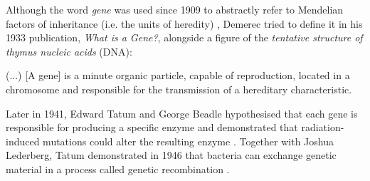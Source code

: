 Although the word \emph{gene} was used since 1909 to abstractly refer to Mendelian factors of inheritance (i.e. the units of heredity) \cite{}, Demerec tried to define it in his 1933 publication, \emph{What is a Gene?}, alongside a figure of the \emph{tentative structure of thymus nucleic acids} (DNA):

\begin{displayquote}
(...) [A gene] is a minute organic particle, capable of reproduction, located in a chromosome and responsible for the transmission of a hereditary characteristic.
\end{displayquote}

Later in 1941, Edward Tatum and George Beadle hypothesised that each gene is responsible for producing a specific enzyme and demonstrated that radiation-induced mutations could alter the resulting enzyme \cite{beadle:1941vs}. Together with Joshua Lederberg, Tatum demonstrated in 1946 that bacteria can exchange genetic material in a process called genetic recombination \cite{lederberg:1946wl}.



